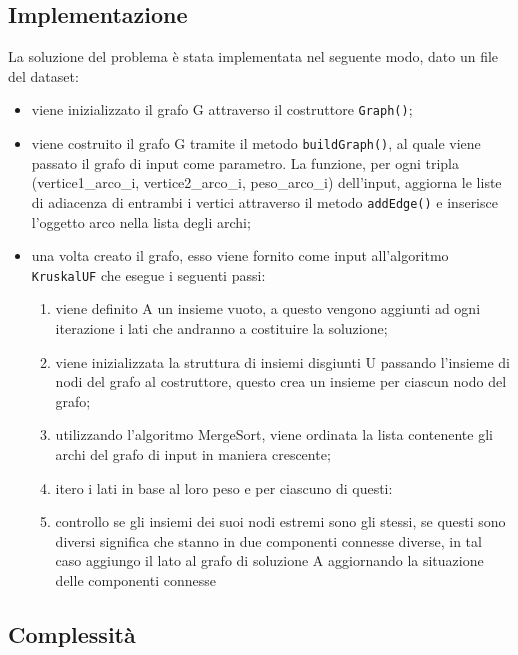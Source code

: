 	\subsection{Implementazione}
		La soluzione del problema è stata implementata nel seguente modo, dato un file del dataset:
		\begin{itemize}
			\item viene inizializzato il grafo G attraverso il costruttore \texttt{Graph()};
			\item viene costruito il grafo G tramite il metodo \texttt{buildGraph()}, al quale viene passato il grafo di input come parametro. La funzione, per ogni tripla (vertice1\_arco\_i, vertice2\_arco\_i, peso\_arco\_i) dell'input, aggiorna le liste di adiacenza di entrambi i vertici attraverso il metodo \texttt{addEdge()} e inserisce l'oggetto arco nella lista degli archi; 
			\item una volta creato il grafo, esso viene fornito come input all'algoritmo \texttt{KruskalUF} che esegue i seguenti passi:
			\begin{enumerate}  				
				\item viene definito A un insieme vuoto, a questo vengono aggiunti ad ogni iterazione i lati che andranno a costituire la soluzione;
				\item viene inizializzata la struttura di insiemi disgiunti U passando l'insieme di nodi del grafo al costruttore, questo crea un insieme per ciascun nodo del grafo;
				\item utilizzando l'algoritmo MergeSort, viene ordinata la lista contenente gli archi del grafo di input in maniera crescente;		
				\item itero i lati in base al loro peso e per ciascuno di questi:
				\item controllo se gli insiemi dei suoi nodi estremi sono gli stessi, se questi sono diversi significa che stanno in due componenti connesse diverse, in tal caso aggiungo il lato al grafo di soluzione A aggiornando la situazione delle componenti connesse
				
			\end{enumerate}
		\end{itemize}
	
	\subsection{Complessità}
	
